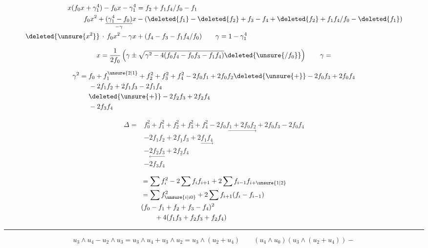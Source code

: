 \[
\begin{aligned}
x(f_0x+\gamma_1^4)-f_0x-\gamma_1^4&=f_2+f_1f_4/f_0-f_1\\
f_0x^2+\underset{-\gamma}{\underline{(\gamma_1^4-f_0)}}x
&-(\deleted{f_1}-\deleted{f_2}+f_3-f_4+\deleted{f_2}+f_1f_4/f_0-\deleted{f_1})\\
\deleted{\unsure{x^2}}\,\cdot\, f_0x^2-\gamma x&+(f_4-f_3-f_1f_4/f_0)
\qquad \gamma=1-\gamma_1^4
\end{aligned}
\]

\[
x=\frac{1}{2f_0}\left(\gamma\pm\sqrt{\gamma^2-4(f_0f_4-f_0f_3-f_1f_4)}\deleted{\unsure{/f_0}}\right)
\qquad \gamma=
\]

\[
\begin{aligned}
\gamma^2={}&f_0+f_1^{\unsure{2|1}}+f_2^2+f_3^2+f_4^2-2f_0f_1+2f_0f_2
\deleted{\unsure{+}}-2f_0f_3+2f_0f_4\\
&-2f_1f_2+2f_1f_3-2f_1f_4\\
&\deleted{\unsure{+}}-2f_2f_3+2f_2f_4\\
&-2f_3f_4
\end{aligned}
\]

\[
\begin{aligned}
\Delta={}&f_0^2+f_1^2+f_2^2+f_3^2+f_4^2-\underset{\longrightarrow}{\boxed{2f_0f_1}+\boxed{2f_0f_2}}+\boxed{2f_0f_3}-\boxed{2f_0f_4}\\
&-\boxed{2f_1f_2}+\underline{\boxed{2f_1f_3}}+2\underset{\longrightarrow}{\boxed{f_1f_4}}\\
&-\underset{\longleftarrow}{\boxed{2f_2f_3}}+\underline{\boxed{2f_2f_4}}\\
&-\boxed{2f_3f_4}
\end{aligned}
\]

\[
\begin{aligned}
&=\sum f_i^2-2\sum f_i f_{i+1}+2\sum f_{i-1}f_{i+\unsure{1|2}}\\
&=\sum f_{\unsure{i|i0}}^2+2\sum f_{i+1}(f_i-f_{i-1})\\
&(f_0-f_1+f_2+f_3-f_4)^2\\
&\qquad+4(f_1f_3+f_2f_3+f_2f_4)
\end{aligned}
\]

\noindent\rule{\linewidth}{.3pt}
{\small
\[
u_3\wedge u_4-u_2\wedge u_3=u_3\wedge u_4+u_3\wedge u_2=u_3\wedge(u_2+u_4)
\qquad (u_4\wedge u_0)(u_3\wedge(u_2+u_4))-
\]
}

